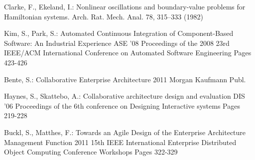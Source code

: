 \documentclass{llncs}
\begin{document}
\cite{SeojinKim:2008:ACI:1642931.1642990}
\cite{clar:eke}


\begin{thebibliography}{1}
Clarke, F., Ekeland, I.:
Nonlinear oscillations and boundary-value problems for
Hamiltonian systems.
Arch. Rat. Mech. Anal. 78, 315--333 (1982)

Kim, S., Park, S.:
Automated Continuous Integration of Component-Based Software: An Industrial Experience
ASE '08 Proceedings of the 2008 23rd IEEE/ACM International Conference on Automated Software Engineering
Pages 423-426

Bente, S.:
Collaborative Enterprise Architecture
2011 Morgan Kaufmann Publ.

Haynes, S., Skattebo, A.:
Collaborative architecture design and evaluation
DIS '06 Proceedings of the 6th conference on Designing Interactive systems
Pages 219-228

Buckl, S., Matthes, F.:
Towards an Agile Design of the Enterprise Architecture Management Function
2011 15th IEEE International Enterprise Distributed Object Computing Conference Workshops
Pages 322-329

%
\end{thebibliography}
\end{document}
